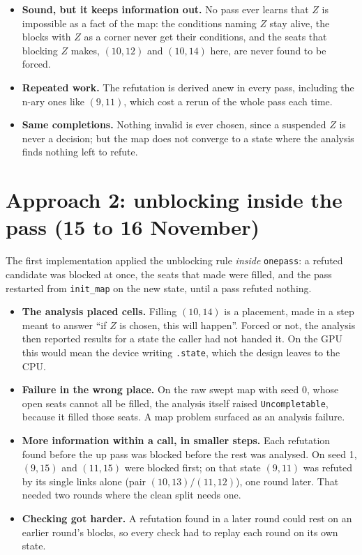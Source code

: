 \documentclass[10pt,a4paper]{article}
\newcommand{\code}[1]{\texttt{#1}}
\begin{document}
\begin{itemize}[leftmargin=*,itemsep=0.2em]
\item \textbf{Sound, but it keeps information out.} No pass ever learns that $Z$ is impossible as a fact of the map: the conditions naming $Z$ stay alive, the blocks with $Z$ as a corner never get their conditions, and the seats that blocking $Z$ makes, $(10,12)$ and $(10,14)$ here, are never found to be forced.
\item \textbf{Repeated work.} The refutation is derived anew in every pass, including the n-ary ones like $(9,11)$, which cost a rerun of the whole pass each time.
\item \textbf{Same completions.} Nothing invalid is ever chosen, since a suspended $Z$ is never a decision; but the map does not converge to a state where the analysis finds nothing left to refute.
\end{itemize}

\section{Approach 2: unblocking inside the pass (15 to 16 November)}

The first implementation applied the unblocking rule \emph{inside} \code{onepass}: a refuted candidate was blocked at once, the seats that made were filled, and the pass restarted from \code{init\_map} on the new state, until a pass refuted nothing.

\begin{itemize}[leftmargin=*,itemsep=0.2em]
\item \textbf{The analysis placed cells.} Filling $(10,14)$ is a placement, made in a step meant to answer ``if $Z$ is chosen, this will happen''. Forced or not, the analysis then reported results for a state the caller had not handed it. On the GPU this would mean the device writing \code{.state}, which the design leaves to the CPU.
\item \textbf{Failure in the wrong place.} On the raw swept map with seed 0, whose open seats cannot all be filled, the analysis itself raised \code{Uncompletable}, because it filled those seats. A map problem surfaced as an analysis failure.
\item \textbf{More information within a call, in smaller steps.} Each refutation found before the up pass was blocked before the rest was analysed. On seed 1, $(9,15)$ and $(11,15)$ were blocked first; on that state $(9,11)$ was refuted by its single links alone (pair $(10,13)/(11,12)$), one round later. That needed two rounds where the clean split needs one.
\item \textbf{Checking got harder.} A refutation found in a later round could rest on an earlier round's blocks, so every check had to replay each round on its own state.
\end{itemize}
\end{document}
